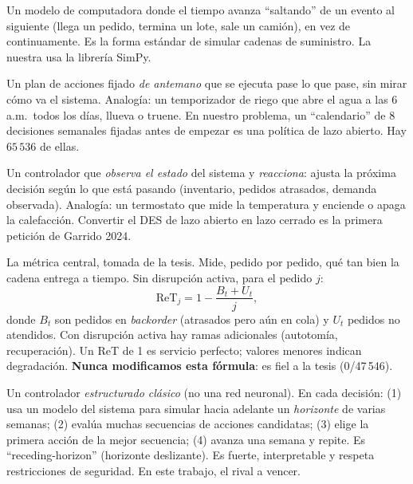 \documentclass[11pt,a4paper]{article}
\newcommand{\ret}{\text{ReT}}
\begin{document}
\begin{description}[style=unboxed,leftmargin=0pt]
\item[Simulación de eventos discretos (DES, \emph{Discrete-Event Simulation}).]
Un modelo de computadora donde el tiempo avanza ``saltando'' de un evento al siguiente (llega un
pedido, termina un lote, sale un camión), en vez de continuamente. Es la forma estándar de simular
cadenas de suministro. La nuestra usa la librería SimPy.

\item[Lazo abierto (\emph{open loop}).]
Un plan de acciones fijado \emph{de antemano} que se ejecuta pase lo que pase, sin mirar cómo va el
sistema. Analogía: un temporizador de riego que abre el agua a las 6\,a.m.\ todos los días, llueva o
truene. En nuestro problema, un ``calendario'' de 8 decisiones semanales fijadas antes de empezar es
una política de lazo abierto. Hay $65\,536$ de ellas.

\item[Lazo cerrado (\emph{closed loop}).]
Un controlador que \emph{observa el estado} del sistema y \emph{reacciona}: ajusta la próxima decisión
según lo que está pasando (inventario, pedidos atrasados, demanda observada). Analogía: un termostato
que mide la temperatura y enciende o apaga la calefacción. Convertir el DES de lazo abierto en lazo
cerrado es la primera petición de Garrido 2024.

\item[Resiliencia ReT (\emph{Resilience over Time}).]
La métrica central, tomada de la tesis. Mide, pedido por pedido, qué tan bien la cadena entrega a
tiempo. Sin disrupción activa, para el pedido $j$:
\[
\ret_j = 1 - \frac{B_{t}+U_{t}}{j},
\]
donde $B_t$ son pedidos en \emph{backorder} (atrasados pero aún en cola) y $U_t$ pedidos no atendidos.
Con disrupción activa hay ramas adicionales (autotomía, recuperación). Un ReT de 1 es servicio
perfecto; valores menores indican degradación. \textbf{Nunca modificamos esta fórmula}: es fiel a la
tesis (0/47\,546).

\item[MPC (\emph{Model Predictive Control}, control predictivo por modelo).]
Un controlador \emph{estructurado clásico} (no una red neuronal). En cada decisión: (1) usa un modelo
del sistema para simular hacia adelante un \emph{horizonte} de varias semanas; (2) evalúa muchas
secuencias de acciones candidatas; (3) elige la primera acción de la mejor secuencia; (4) avanza una
semana y repite. Es ``receding-horizon'' (horizonte deslizante). Es fuerte, interpretable y respeta
restricciones de seguridad. En este trabajo, el rival a vencer.


\end{description}
\end{document}
